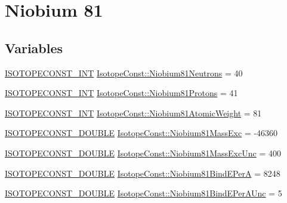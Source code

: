 \hypertarget{group___isotope_const-_niobium-_nb81}{}\section{Niobium 81}
\label{group___isotope_const-_niobium-_nb81}
\subsection*{Variables}
\begin{DoxyCompactItemize}
\item 
\mbox{\hyperlink{group___isotope_const-_macros_ga5f18360b3e99483a35c32d789e62621c}{I\+S\+O\+T\+O\+P\+E\+C\+O\+N\+S\+T\+\_\+\+I\+NT}} \mbox{\hyperlink{group___isotope_const-_niobium-_nb81_ga4ca5f9043acd86f0b5c2d61c0b94ed5f}{Isotope\+Const\+::\+Niobium81\+Neutrons}} = 40
\item 
\mbox{\hyperlink{group___isotope_const-_macros_ga5f18360b3e99483a35c32d789e62621c}{I\+S\+O\+T\+O\+P\+E\+C\+O\+N\+S\+T\+\_\+\+I\+NT}} \mbox{\hyperlink{group___isotope_const-_niobium-_nb81_ga4aeb4c9d6d6ab2dd8acab50e718a4a3a}{Isotope\+Const\+::\+Niobium81\+Protons}} = 41
\item 
\mbox{\hyperlink{group___isotope_const-_macros_ga5f18360b3e99483a35c32d789e62621c}{I\+S\+O\+T\+O\+P\+E\+C\+O\+N\+S\+T\+\_\+\+I\+NT}} \mbox{\hyperlink{group___isotope_const-_niobium-_nb81_ga7bcc9b121226ed7f84d8df7a2d1ba166}{Isotope\+Const\+::\+Niobium81\+Atomic\+Weight}} = 81
\item 
\mbox{\hyperlink{group___isotope_const-_macros_ga8f45a7272ce02c0b4c65c44636ed719a}{I\+S\+O\+T\+O\+P\+E\+C\+O\+N\+S\+T\+\_\+\+D\+O\+U\+B\+LE}} \mbox{\hyperlink{group___isotope_const-_niobium-_nb81_ga239c138f4d37d2d7337d2ebc0c4311d4}{Isotope\+Const\+::\+Niobium81\+Mass\+Exc}} = -\/46360
\item 
\mbox{\hyperlink{group___isotope_const-_macros_ga8f45a7272ce02c0b4c65c44636ed719a}{I\+S\+O\+T\+O\+P\+E\+C\+O\+N\+S\+T\+\_\+\+D\+O\+U\+B\+LE}} \mbox{\hyperlink{group___isotope_const-_niobium-_nb81_ga39fbb168a9841a297f65f5086e355530}{Isotope\+Const\+::\+Niobium81\+Mass\+Exc\+Unc}} = 400
\item 
\mbox{\hyperlink{group___isotope_const-_macros_ga8f45a7272ce02c0b4c65c44636ed719a}{I\+S\+O\+T\+O\+P\+E\+C\+O\+N\+S\+T\+\_\+\+D\+O\+U\+B\+LE}} \mbox{\hyperlink{group___isotope_const-_niobium-_nb81_ga89dec5e2b4c1e8a4e2d0336210cd4188}{Isotope\+Const\+::\+Niobium81\+Bind\+E\+PerA}} = 8248
\item 
\mbox{\hyperlink{group___isotope_const-_macros_ga8f45a7272ce02c0b4c65c44636ed719a}{I\+S\+O\+T\+O\+P\+E\+C\+O\+N\+S\+T\+\_\+\+D\+O\+U\+B\+LE}} \mbox{\hyperlink{group___isotope_const-_niobium-_nb81_gaf7950615c2f8d50d77880ebcd6ea39b6}{Isotope\+Const\+::\+Niobium81\+Bind\+E\+Per\+A\+Unc}} = 5

\end{DoxyCompactItemize}
